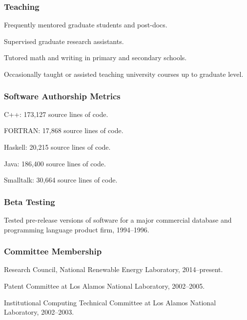 \documentclass[]{article}
\begin{document}
\subsubsection{Teaching}\label{teaching}

Frequently mentored graduate students and post-docs.

Supervised graduate research assistants.

Tutored math and writing in primary and secondary schools.

Occasionally taught or assisted teaching university courses up to
graduate level.

\subsubsection{Software Authorship
Metrics}\label{software-authorship-metrics}

C++: 173,127 source lines of code.

FORTRAN: 17,868 source lines of code.

Haskell: 20,215 source lines of code.

Java: 186,400 source lines of code.

Smalltalk: 30,664 source lines of code.

\subsubsection{Beta Testing}\label{beta-testing}

Tested pre-release versions of software for a major commercial database
and programming language product firm, 1994--1996.

\subsubsection{Committee Membership}\label{committee-membership}

Research Council, National Renewable Energy Laboratory, 2014--present.

Patent Committee at Los Alamos National Laboratory, 2002--2005.

Institutional Computing Technical Committee at Los Alamos National
Laboratory, 2002--2003.
\end{document}
